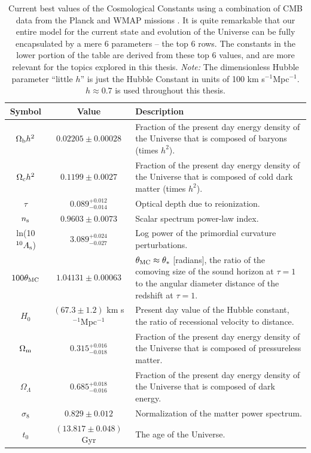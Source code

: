 \begin{table}%
 \begin{center}
    \begin{tabular}{|c|c|p{10cm}|}

      \hline
      Symbol & Value & Description \\ \hline \hline

      $\Omega_{\rm b}h^2$ & $0.02205\pm0.00028$ & Fraction of the present day energy density of the Universe that is composed of baryons (times $h^2$). \\ \hline
      $\Omega_{\rm c}h^2$ & $0.1199\pm0.0027$ & Fraction of the present day energy density of the Universe that is composed of cold dark matter (times $h^2$). \\ \hline
      $\tau$ & $0.089^{+0.012}_{-0.014}$ & Optical depth due to reionization. \\ \hline
      $n_{\rm s}$ & $0.9603\pm0.0073$ & Scalar spectrum power-law index. \\ \hline
      ln(10$^{10}A_{\rm s}$) & $3.089^{+0.024}_{-0.027}$ & Log power of the primordial curvature perturbations. \\ \hline 
      $100\theta_{\rm MC}$ & $1.04131\pm0.00063$ & $\theta_{\rm MC} \approx \theta_*$ [radians], the ratio of the comoving size of the sound horizon at $\tau=1$ to the angular diameter distance of the redshift at $\tau=1$. \\ \hline \hline 

      $H_0$ & $(67.3\pm1.2)$ km s$^{-1}$Mpc$^{-1}$ & Present day value of the Hubble constant, the ratio of recessional velocity to distance. \\ \hline
      $\Omega_{\rm m}$ & $0.315^{+0.016}_{-0.018}$ & Fraction of the present day energy density of the Universe that is composed of pressureless matter. \\ \hline
      $\Omega_{\Lambda}$ & $0.685^{+0.018}_{-0.016}$ & Fraction of the present day energy density of the Universe that is composed of dark energy. \\ \hline
      $\sigma_8$ & $0.829\pm0.012$ & Normalization of the matter power spectrum. \\ \hline
      $t_0$ & $(13.817\pm0.048)$ Gyr & The age of the Universe. \\ \hline

    \end{tabular}
  \caption[Cosmological Constants]{Current best values of the Cosmological Constants using a combination of \ac{CMB} data from the \acs{Planck} and \ac{WMAP} missions \citep{PlanckXVI}. It is quite remarkable that our entire model for the current state and evolution of the Universe can be fully encapsulated by a mere 6 parameters -- the top 6 rows. The constants in the lower portion of the table are derived from these top 6 values, and are more relevant for the topics explored in this thesis. {\it Note: }The dimensionless Hubble parameter ``little $h$'' is just the Hubble Constant in units of 100 km s$^{-1}$Mpc$^{-1}$. $h \approx 0.7$ is used throughout this thesis.}
  \label{table:constants}

 \end{center}
\end{table}


